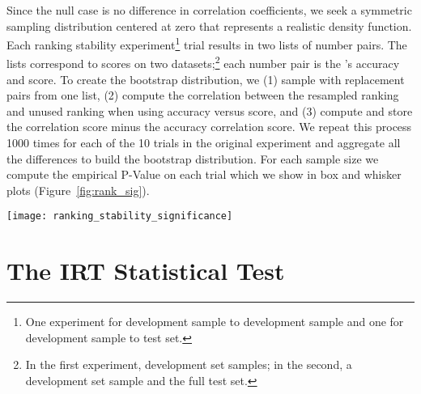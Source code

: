 Since the null case is no difference in correlation coefficients, we seek a symmetric sampling distribution centered at zero that represents a realistic density function.
Each ranking stability experiment\footnote{One experiment for development sample to development sample and one for development sample to test set.} trial results in two lists of number pairs.
The lists correspond to \subj{} scores on two datasets;\footnote{
  In the first experiment, development set samples; in the second, a development set sample and the full test set.
} each number pair is the \subj{}'s accuracy and \irt{} score.
To create the bootstrap distribution, we (1) sample with replacement pairs from one list, (2) compute the correlation between the resampled ranking and unused ranking when using accuracy versus \irt{} score, and (3) compute and store the \irt{} correlation score minus the accuracy correlation score.
We repeat this process 1000 times for each of the 10 trials in the original experiment and aggregate all the differences to build the bootstrap distribution.
For each sample size we compute the empirical P-Value on each trial which we show in box and whisker plots (Figure~\ref{fig:rank_sig}).

\begin{figure*}[t]
  \centering
  \texttt{[image: ranking\_stability\_significance]}
  \caption{
    P-values of the rank correlation difference for each sample size and trial in Figure~\ref{fig:stability}.
    The inherent noise in dev set sampling makes inferring significance difficult (left); test set driven results (right) are more significant.
  }
  \label{fig:rank_sig}
\end{figure*}


\section{The IRT Statistical Test}
\label{ch:isicle:irt-test}

